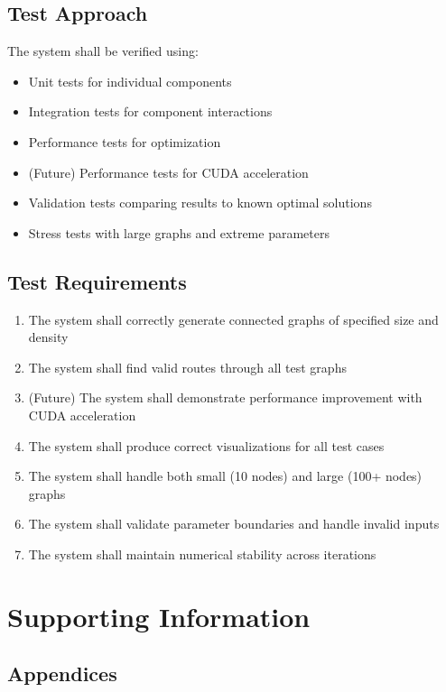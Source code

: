 \documentclass[conference]{IEEEtran}
\begin{document}
\subsection{Test Approach}
The system shall be verified using:
\begin{itemize}
    \item Unit tests for individual components
    \item Integration tests for component interactions
    \item Performance tests for optimization
    \item (Future) Performance tests for CUDA acceleration
    \item Validation tests comparing results to known optimal solutions
    \item Stress tests with large graphs and extreme parameters
\end{itemize}

\subsection{Test Requirements}
\begin{enumerate}
    \item The system shall correctly generate connected graphs of specified size and density
    \item The system shall find valid routes through all test graphs
    \item (Future) The system shall demonstrate performance improvement with CUDA acceleration
    \item The system shall produce correct visualizations for all test cases
    \item The system shall handle both small (10 nodes) and large (100+ nodes) graphs
    \item The system shall validate parameter boundaries and handle invalid inputs
    \item The system shall maintain numerical stability across iterations
\end{enumerate}

\section{Supporting Information}

\subsection{Appendices}
\end{document}
